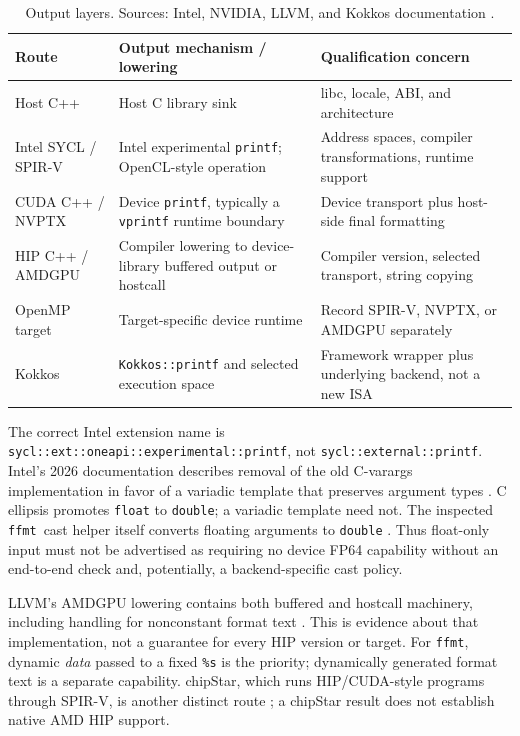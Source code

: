\documentclass[11pt,letterpaper]{article}
\newcommand{\ffmt}{\texttt{ffmt}}
\begin{document}
\begin{table}[!htbp]
\centering\small
\begin{tabularx}{\linewidth}{@{}P{2.7cm} Y Y@{}}
\toprule
Route & Output mechanism / lowering & Qualification concern \\
\midrule
Host C++ & Host C library sink & libc, locale, ABI, and architecture \\
Intel SYCL / SPIR-V & Intel experimental \texttt{printf}; OpenCL-style operation & Address spaces, compiler transformations, runtime support \\
CUDA C++ / NVPTX & Device \texttt{printf}, typically a \texttt{vprintf} runtime boundary & Device transport plus host-side final formatting \\
HIP C++ / AMDGPU & Compiler lowering to device-library buffered output or hostcall & Compiler version, selected transport, string copying \\
OpenMP target & Target-specific device runtime & Record SPIR-V, NVPTX, or AMDGPU separately \\
Kokkos & \texttt{Kokkos::printf} and selected execution space & Framework wrapper plus underlying backend, not a new ISA \\
\bottomrule
\end{tabularx}
\caption{Output layers. Sources: Intel, NVIDIA, LLVM, and Kokkos documentation
\cite{intel-printf,cuda-printf,amdgpu-printf,kokkos-printf}.}
\label{tab:primitives}
\end{table}

The correct Intel extension name is
\texttt{sycl::ext::oneapi::experimental::printf}, not
\texttt{sycl::external::printf}. Intel's 2026 documentation describes removal
of the old C-varargs implementation in favor of a variadic template that
preserves argument types \cite{intel-printf}. C ellipsis promotes
\texttt{float} to \texttt{double}; a variadic template need not. The inspected
\ffmt\ cast helper itself converts floating arguments to \texttt{double}
\cite{ffmt-source}. Thus float-only input must not be advertised as requiring
no device FP64 capability without an end-to-end check and, potentially, a
backend-specific cast policy.

LLVM's AMDGPU lowering contains both buffered and hostcall machinery, including
handling for nonconstant format text \cite{amdgpu-printf}. This is evidence
about that implementation, not a guarantee for every HIP version or target.
For \ffmt, dynamic \emph{data} passed to a fixed \texttt{\%s} is the priority;
dynamically generated format text is a separate capability. chipStar, which
runs HIP/CUDA-style programs through SPIR-V, is another distinct route
\cite{chipstar}; a chipStar result does not establish native AMD HIP support.
\end{document}
